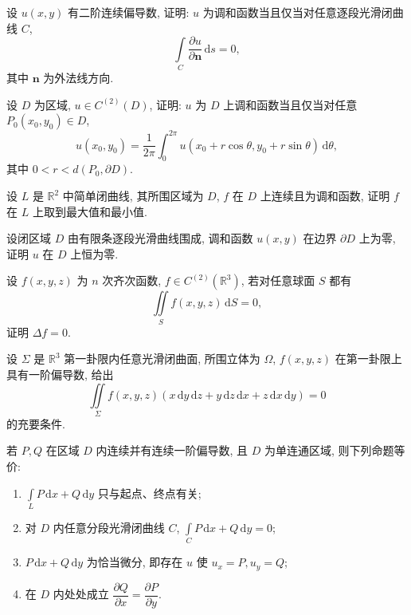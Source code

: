\documentclass[../数学分析培优讲义.tex]{subfiles}
\begin{document}
\begin{example}
设 $u(x,y)$ 有二阶连续偏导数, 证明: $u$ 为调和函数当且仅当对任意逐段光滑闭曲线 $C$,
\[
    \int\limits_C\dfrac{\partial u}{\partial\bm n}\,\mathrm{d}s=0,
\]
其中 $\bm n$ 为外法线方向.
\end{example}
\exampleblank

\begin{example}
设 $D$ 为区域, $u\in C^{(2)}(D)$, 证明: $u$ 为 $D$ 上调和函数当且仅当对任意 $P_0(x_0,y_0)\in D$,
\[
    u(x_0,y_0)=\dfrac{1}{2\pi}\int_0^{2\pi}u(x_0+r\cos\theta,y_0+r\sin\theta)\,\mathrm{d}\theta,
\]
其中 $0<r<d(P_0,\partial D)$.
\end{example}
\exampleblank

\begin{example}
设 $L$ 是 $\mathbb{R}^2$ 中简单闭曲线, 其所围区域为 $D$, $f$ 在 $D$ 上连续且为调和函数, 证明 $f$ 在 $L$ 上取到最大值和最小值.
\end{example}
\exampleblank

\begin{example}
设闭区域 $D$ 由有限条逐段光滑曲线围成, 调和函数 $u(x,y)$ 在边界 $\partial D$ 上为零, 证明 $u$ 在 $D$ 上恒为零.
\end{example}
\exampleblank

\begin{example}
设 $f(x,y,z)$ 为 $n$ 次齐次函数, $f\in C^{(2)}(\mathbb{R}^3)$, 若对任意球面 $S$ 都有
\[
    \iint\limits_Sf(x,y,z)\,\mathrm{d}S=0,
\]
证明 $\Delta f=0$.
\end{example}
\exampleblank

\begin{example}
设 $\Sigma$ 是 $\mathbb{R}^3$ 第一卦限内任意光滑闭曲面, 所围立体为 $\Omega$, $f(x,y,z)$ 在第一卦限上具有一阶偏导数, 给出
\[
    \iint\limits_\Sigma f(x,y,z)(x\,\mathrm{d}y\,\mathrm{d}z+y\,\mathrm{d}z\,\mathrm{d}x+z\,\mathrm{d}x\,\mathrm{d}y)=0
\]
的充要条件.
\end{example}
\exampleblank


\newpage


\begin{theorem}[\markstar]
若 $P,Q$ 在区域 $D$ 内连续并有连续一阶偏导数, 且 $D$ 为单连通区域, 则下列命题等价:
\begin{enumerate}[label=(\arabic*)]
    \item $\displaystyle\int\limits_LP\,\mathrm{d}x+Q\,\mathrm{d}y$ 只与起点、终点有关;
    \item 对 $D$ 内任意分段光滑闭曲线 $C$, $\displaystyle\int\limits_CP\,\mathrm{d}x+Q\,\mathrm{d}y=0$;
    \item $P\,\mathrm{d}x+Q\,\mathrm{d}y$ 为恰当微分, 即存在 $u$ 使 $u_x=P,u_y=Q$;
    \item 在 $D$ 内处处成立 $\dfrac{\partial Q}{\partial x}=\dfrac{\partial P}{\partial y}$.
\end{enumerate}
\end{theorem}
\end{document}
